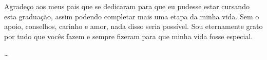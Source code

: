 \begin{agradecimentos}

  Agradeço aos meus pais que se dedicaram para que eu pudesse estar cursando esta graduação, assim podendo completar mais uma etapa da minha vida. Sem o apoio, conselhos, carinho e amor, nada disso seria possível. Sou eternamente grato por tudo que vocês fazem e sempre fizeram para que minha vida fosse especial.

  \dots

\end{agradecimentos}